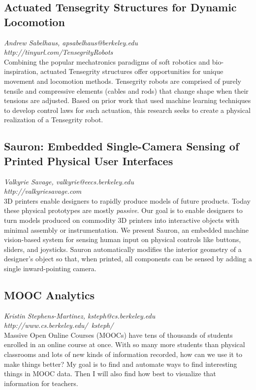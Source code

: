 \documentclass[foldmark,10pt,a4paper,notumble]{leaflet}
\begin{document}
\subsection{Actuated Tensegrity Structures for Dynamic Locomotion}
\emph{Andrew Sabelhaus, apsabelhaus@berkeley.edu}\\
\emph{http://tinyurl.com/TensegrityRobots}\\
Combining the popular mechatronics paradigms of soft robotics and bio-inspiration, actuated Tensegrity structures offer opportunities for unique movement and locomotion methods. Tensegrity robots are comprised of purely tensile and compressive elements (cables and rods) that change shape when their tensions are adjusted. Based on prior work that used machine learning techniques to develop control laws for such actuation, this research seeks to create a physical realization of a Tensegrity robot.

\subsection{Sauron: Embedded Single-Camera Sensing of Printed Physical User Interfaces}
\emph{Valkyrie Savage, valkyrie@eecs.berkeley.edu}\\
\emph{http://valkyriesavage.com}\\
3D printers enable designers to rapidly produce models of future products.  Today these physical prototypes are mostly \emph{passive}.  Our goal is to enable designers to turn models produced on commodity 3D printers into interactive objects with minimal assembly or instrumentation.  We present Sauron, an embedded machine vision-based system for sensing human input on physical controls like buttons, sliders, and joysticks.  Sauron automatically modifies the interior geometry of a designer's object so that, when printed, all components can be sensed by adding a single inward-pointing camera.

\subsection{MOOC Analytics}
\emph{Kristin Stephens-Martinez, ksteph@cs.berkeley.edu}\\
\emph{http://www.cs.berkeley.edu/~ksteph/}\\
Massive Open Online Courses (MOOCs) have tens of thousands of students enrolled in an online course at once. With so many more students than physical classrooms and lots of new kinds of information recorded, how can we use it to make things better? My goal is to find and automate ways to find interesting things in MOOC data. Then I will also find how best to visualize that information for teachers.
\end{document}
